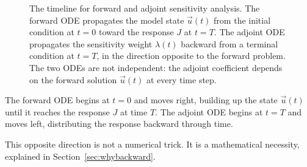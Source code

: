 \begin{figure}[htb]
\centering
{}
\caption{The timeline for forward and adjoint sensitivity analysis.
         The forward ODE propagates the model state $\vec{u}(t)$ from
         the initial condition at $t=0$ toward the response $J$ at $t=T$.
         The adjoint ODE propagates the sensitivity weight $\lambda(t)$
         backward from a terminal condition at $t=T$, in the direction
         opposite to the forward problem.
         The two ODEs are not independent: the adjoint coefficient
         depends on the forward solution $\vec{u}(t)$ at every time step.}
\label{fig:timeline}
\end{figure}

The forward ODE begins at $t=0$ and moves right, building up the state
$\vec{u}(t)$ until it reaches the response $J$ at time $T$.
The adjoint ODE begins at $t=T$ and moves left, distributing the
response backward through time.

This opposite direction is not a numerical trick. It is a mathematical
necessity, explained in Section~\ref{sec:whybackward}.


